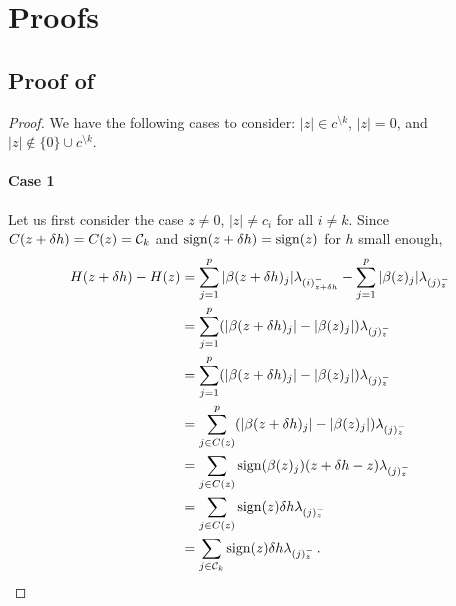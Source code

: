 \section{Proofs}\label{sec:proofs}

\subsection{Proof of }

\begin{proof}\label{app:proof_directional_derivative}
  \label{app:proof_directional_slope}
  We have the following cases to consider: \(|z| \in c^{\setminus k}\),
  \(|z| = 0\), and \(|z| \notin \{0\} \cup c^{\setminus k}\).


  \paragraph{Case 1}
  Let us first consider the case $z \neq 0$, $|z| \neq c_i$ for all $i \neq k$.
  Since \(C(z + \delta h) = C(z) = \mathcal{C}_k\) and $\operatorname{sign}(z + \delta h) = \operatorname{sign}(z)$ for $h$ small enough,
  \begin{align}
    H(z + \delta h) - H(z)
      &= \sum_{j =1}^p |\beta(z + \delta h)_j| \lambda_{(i)^-_{z + \delta h}}
          - \sum_{j=1}^p |\beta(z)_j| \lambda_{(j)^-_z} \nonumber \\
      &= \sum_{j =1}^p (|\beta(z + \delta h)_j| - |\beta(z)_j|) \lambda_{(j)^-_z} \nonumber  \\
      &= \sum_{j =1}^p (|\beta(z + \delta h)_j| - |\beta(z)_j|) \lambda_{(j)^-_z} \nonumber  \\
      &= \sum_{j \in C(z)}^p (|\beta(z + \delta h)_j| - |\beta(z)_j|) \lambda_{(j)^-_z} \nonumber \\
      &= \sum_{j \in C(z)} \operatorname{sign}(\beta(z)_j) (z + \delta h - z) \lambda_{(j)^-_z} \nonumber \\
      &= \sum_{j \in C(z)} \operatorname{sign}(z) \delta h  \lambda_{(j)^-_z} \nonumber \\
      &= \sum_{j \in \mathcal{C}_k} \operatorname{sign}(z) \delta h  \lambda_{(j)^-_z} \, .
  \end{align}


\end{proof}
